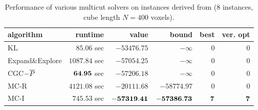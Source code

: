 \begin{table}
\scriptsize
\centering
\begin{tabular}{lrrrrr}
\toprule
           algorithm &         runtime       &           value &           bound &       best &   ver. opt   \\ \midrule 
                  KL & $        85.06$ sec & $    -53476.75$ & $      -\infty$ & $       0$ & $       0$ \\
    Expand\&Explore & $      1087.84$ sec & $    -57054.25$ & $      -\infty$ & $       0$ & $       0$ \\
      CGC$-{\overline{P}}$ & $   {\bf64.95}$ sec & $    -57206.18$ & $      -\infty$ & $       0$ & $       0$ \\   
\cmidrule{1-1} 
                MC-R & $      4121.08$ sec & $    -20111.68$ & $    -58774.97$ & $       0$ & $       0$ \\ 
\cmidrule{1-1} 
                MC-I & $       745.53$ sec & $ {\bf-57319.41}$ & ${\bf-57386.73}$ & ${\bf7}$ & $  {\bf7}$ \\ 
\bottomrule
\end{tabular}
\caption{Performance of various multicut solvers on
instances derived from \cite{kroeger_2012_eccv}
(8 instances, cube length $N=400$ voxels).
\label{tab:smalltable-knott-3d-400}}
\end{table}

